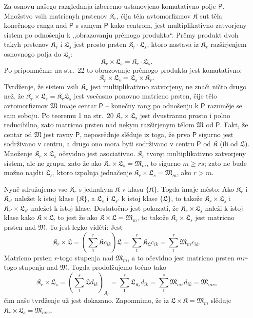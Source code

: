 \documentclass[11pt]{article}
\begin{document}
Za osnovu našego razgledanja izberemo ustanovjeno komutativno polje \(\mathsf P\). Množstvo vsih matricnyh prstenov \(\mathfrak K_r\), čija těla avtomorfizmov \(\mathfrak K\) sut těla konečnogo ranga nad \(\mathsf P\) s samym \(\mathsf P\) kako centrom, jest multiplikativno zatvorjeny sistem po odnošenju k ,,obrazovanju prěmogo produkta``. Prěmy produkt dvoh takyh prstenov \(\mathfrak K_r\) i \(\mathfrak L_s\) jest prosto prsten \(\mathfrak K_r\cdot\mathfrak L_s\), ktoro nastava iz \(\mathfrak K_r\) razširjenjem osnovnogo polja do \(\mathfrak L_s\):
\[
\mathfrak K_r\times\mathfrak L_s=\mathfrak K_r\cdot\mathfrak L_s.
\]
Po pripomněnke na str.~22 to obrazovanje prěmogo produkta jest komutativno:
\[
\mathfrak K_r\times\mathfrak L_s=\mathfrak L_s\times\mathfrak K_r.
\]
Tvrdženje, že sistem vsih \(\mathfrak K_r\) jest multiplikativno zatvorjeny, ne znači ničto drugo než, že \(\mathfrak K_r\times\mathfrak L_s=\mathfrak K_r\mathfrak L_s\) jest vsečasno ponovno matricno prsten, čije tělo avtomorfizmov \(\mathfrak M\) imaje centar \(\mathsf P\) -- konečny rang po odnošenju k \(\mathsf P\) razuměje se sam soboju. Po teoremu 1 na str.~20 \(\mathfrak K_r\times\mathfrak L_s\) jest dvustranno prosto i polno reducibilno, zato matricno prsten nad nekym razširjenym tělom \(\mathfrak M\) od \(\mathsf P\). Fakt, že centar od \(\mathfrak M\) jest ravny \(\mathsf P\), neposrědnje slěduje iz toga, že prvo \(\mathsf P\) sigurno jest sodrživano v centru, a drugo ono mora byti sodrživano v centru \(\mathsf P\) od \(\mathfrak K\) (ili od \(\mathfrak L\)). Množenje \(\mathfrak K_r\times\mathfrak L_s\) očevidno jest asociativno. \(\mathfrak K_r\) tvoręt multiplikativno zatvorjeny sistem, ale ne grupu, zato že ako \(\mathfrak K_r\times\mathfrak L_s=\mathfrak M_m\), to sigurno \(m\geq rs\); zato ne bude možno najdti \(\mathfrak L_s\), ktoro izpolnja jednačenje \(\mathfrak K_r\times\mathfrak L_s=\mathfrak M_m\), ako \(r>m\).

Nyně sdružujemo vse \(\mathfrak K_r\) s jednakym \(\mathfrak K\) v klasu \(\{\mathfrak K\}\). Togda imaje město: Ako \(\mathfrak K_r\) i \(\mathfrak K_{r'}\) naležet k istoj klase \(\{\mathfrak K\}\), a \(\mathfrak L_s\) i \(\mathfrak L_{s'}\) k istoj klase \(\{\mathfrak L\}\), to takože \(\mathfrak K_r\times\mathfrak L_s\) i \(\mathfrak K_{r'}\times\mathfrak L_{s'}\) naležet k istoj klase. Dostatočno jest pokazati, že \(\mathfrak K_r\times\mathfrak L_s\) naleži k istoj klase kako \(\mathfrak K\times\mathfrak L\), to jest že ako \(\mathfrak K\times\mathfrak L=\mathfrak M_m\), to takože \(\mathfrak K_r\times\mathfrak L_s\) jest matricno prsten nad \(\mathfrak M\). To jest legko viděti: Jest
\[
\mathfrak K_r\times\mathfrak L
=\left(\sum_1^r\mathfrak K c_{ik}\right)\mathfrak L
=\sum_1^r\mathfrak K_{\mathfrak L}c_{ik}
=\sum_1^r\mathfrak M_m c_{ik}.
\]
Matricno prsten \(r\)-togo stupenja nad \(\mathfrak M_m\), a to očevidno jest matricno prsten \(mr\)-togo stupenja nad \(\mathfrak M\). Togda prodolžujemo točno tako
\[
\mathfrak K_r\times\mathfrak L_s
=\left(\sum_1^s\mathfrak L d_{ik}\right)_{\mathfrak K_r}
=\sum_1^s\mathfrak L_{\mathfrak K_r}d_{ik}
=\sum_1^s\mathfrak M_{mr}d_{ik}
=\mathfrak M_{mrs}
\]
čim naše tvrdženje už jest dokazano. Zapomnimo, že iz \(\mathfrak L\times\mathfrak K=\mathfrak M_m\) slěduje \(\mathfrak K_r\times\mathfrak L_s=\mathfrak M_{mrs}\).
\end{document}
